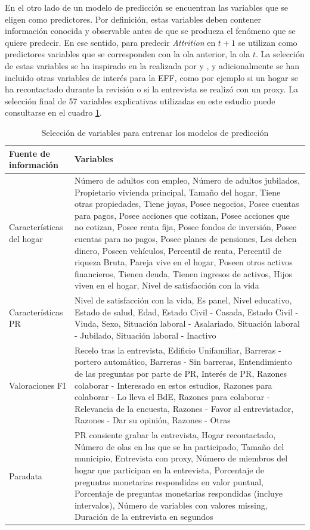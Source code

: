 En el otro lado de un modelo de predicción se encuentran las variables que se eligen como predictores. Por definición, estas variables deben contener información conocida y observable antes de que se producza el fenómeno que se quiere predecir. En ese sentido, para predecir \textit{Attrition} en $t+1$ se utilizan como predictores variables que se corresponden con la ola anterior, la ola $t$. La selección de estas variables se ha inspirado en la realizada por \cite{beste2023case} y \cite{kern2021predicting}, y adicionalmente se han incluido otras variables de interés para la EFF, como por ejemplo si un hogar se ha recontactado durante la revisión o si la entrevista se realizó con un proxy. La selección final de 57 variables explicativas utilizadas en este estudio puede consultarse en el cuadro \ref{table:vars}.

\begin{table}[ht]
    \centering
    \begin{tabular}{|l|p{10cm}|}
    \hline
        \textbf{Fuente de información} & \textbf{Variables} \\ \hline
        Características del hogar & Número de adultos con empleo, Número de adultos jubilados, Propietario vivienda principal, Tamaño del hogar, Tiene otras propiedades, Tiene joyas, Posee negocios, Posee cuentas para pagos, Posee acciones que cotizan, Posee acciones que no cotizan, Posee renta fija, Posee fondos de inversión, Posee cuentas para no pagos, Posee planes de pensiones, Les deben dinero, Poseen vehículos, Percentil de renta, Percentil de riqueza Bruta, Pareja vive en el hogar, Poseen otros activos financieros, Tienen deuda, Tienen ingresos de activos, Hijos viven en el hogar, Nivel de satisfacción con la vida \\ \hline
        Características PR & Nivel de satisfacción con la vida, Es panel, Nivel educativo, Estado de salud, Edad, Estado Civil - Casada, Estado Civil - Viuda, Sexo, Situación laboral - Asalariado, Situación laboral - Jubilado, Situación laboral - Inactivo \\ \hline
        Valoraciones FI & Recelo tras la entrevista, Edificio Unifamiliar, Barreras - portero automático, Barreras - Sin barreras, Entendimiento de las preguntas por parte de PR, Interés de PR, Razones colaborar - Interesado en estos estudios, Razones para colaborar - Lo lleva el BdE, Razones para colaborar - Relevancia de la encuesta, Razones - Favor al entrevistador, Razones - Dar su opinión, Razones - Otras \\ \hline
        Paradata & PR consiente grabar la entrevista, Hogar recontactado, Número de olas en las que se ha participado, Tamaño del municipio, Entrevista con proxy, Número de miembros del hogar que participan en la entrevista, Porcentaje de preguntas monetarias respondidas en valor puntual, Porcentaje de preguntas monetarias respondidas (incluye intervalos), Número de variables con valores missing, Duración de la entrevista en segundos \\ \hline
    \end{tabular}
    \caption{Selección de variables para entrenar los modelos de predicción}
    \label{table:vars}
\end{table}

